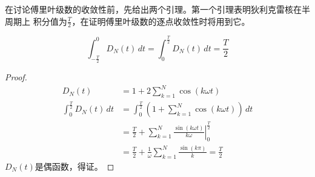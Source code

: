 在讨论傅里叶级数的收敛性前，先给出两个引理。第一个引理表明狄利克雷核在半周期上
积分值为$\frac{T}{2}$，在证明傅里叶级数的逐点收敛性时将用到它。
\begin{lemma}
    $$\int_{-\frac{T}{2}}^{0}D_N(t)\,dt=\int_{0}^{\frac{T}{2}}D_N(t)\,dt=\frac{T}{2}$$
\end{lemma}
\begin{proof}
    \begin{align*}
    D_N(t)&=1+2\sum_{k=1}^{N}\cos(k\omega t)\\
    \int_{0}^{\frac{T}{2}}D_N(t)\,dt & =\int_{0}^{\frac{T}{2}}\left(1+\sum_{k=1}^{N}\cos(k\omega t)\right)\,dt                              \\
                                     & =\frac{T}{2}+\sum_{k=1}^{N}\left.\frac{\sin(k\omega t)}{k\omega}\right|_{0}^{\frac{T}{2}} \\
                                     & =\frac{T}{2}+\frac{1}{\omega}\sum_{k=1}^{N}\frac{\sin(k\pi)}{k}=\frac{T}{2}               
\end{align*}
$D_N(t)$是偶函数，得证。
\end{proof}

